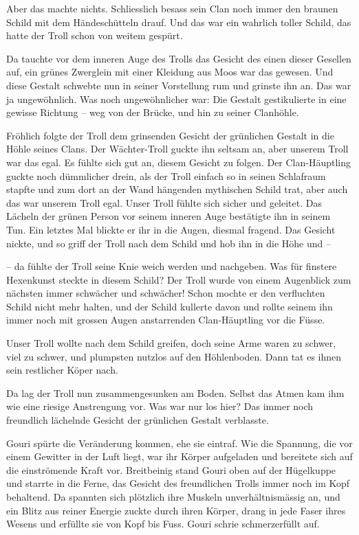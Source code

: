 \documentclass[10pt, a4paper, oneside]{book}
\begin{document}
Aber das machte nichts. Schliesslich besass sein Clan noch immer den braunen Schild mit dem Händeschütteln drauf. Und das war ein wahrlich toller Schild, das hatte der Troll schon von weitem gespürt.

Da tauchte vor dem inneren Auge des Trolls das Gesicht des einen dieser Gesellen auf, ein grünes Zwerglein mit einer Kleidung aus Moos war das gewesen. Und diese Gestalt schwebte nun in seiner Vorstellung rum und grinste ihn an. Das war ja ungewöhnlich. Was noch ungewöhnlicher war: Die Gestalt gestikulierte in eine gewisse Richtung – weg von der Brücke, und hin zu seiner Clanhöhle.
  
Fröhlich folgte der Troll dem grinsenden Gesicht der grünlichen Gestalt in die Höhle seines Clans. Der Wächter-Troll guckte ihn seltsam an, aber unserem Troll war das egal. Es fühlte sich gut an, diesem Gesicht zu folgen. Der Clan-Häuptling guckte noch dümmlicher drein, als der Troll einfach so in seinen Schlafraum stapfte und zum dort an der Wand hängenden mythischen Schild trat, aber auch das war unserem Troll egal. Unser Troll fühlte sich sicher und geleitet. Das Lächeln der grünen Person vor seinem inneren Auge bestätigte ihn in seinem Tun. Ein letztes Mal blickte er ihr in die Augen, diesmal fragend. Das Gesicht nickte, und so griff der Troll nach dem Schild und hob ihn in die Höhe und –

– da fühlte der Troll seine Knie weich werden und nachgeben. Was für finstere Hexenkunst steckte in diesem Schild? Der Troll wurde von einem Augenblick zum nächsten immer schwächer und schwächer! Schon mochte er den verfluchten Schild nicht mehr halten, und der Schild kullerte davon und rollte seinem ihn immer noch mit grossen Augen anstarrenden Clan-Häuptling vor die Füsse.

Unser Troll wollte nach dem Schild greifen, doch seine Arme waren zu schwer, viel zu schwer, und plumpsten nutzlos auf den Höhlenboden. Dann tat es ihnen sein restlicher Köper nach.

Da lag der Troll nun zusammengesunken am Boden. Selbst das Atmen kam ihm wie eine riesige Anstrengung vor. Was war nur los hier? Das immer noch freundlich lächelnde Gesicht der grünlichen Gestalt verblasste.\bigskip



Gouri spürte die Veränderung kommen, ehe sie eintraf. Wie die Spannung, die vor einem Gewitter in der Luft liegt, war ihr Körper aufgeladen und bereitete sich auf die einströmende Kraft vor. Breitbeinig stand Gouri oben auf der Hügelkuppe und starrte in die Ferne, das Gesicht des freundlichen Trolls immer noch im Kopf behaltend. Da spannten sich plötzlich ihre Muskeln unverhältnismässig an, und ein Blitz aus reiner Energie zuckte durch ihren Körper, drang in jede Faser ihres Wesens und erfüllte sie von Kopf bis Fuss. Gouri schrie schmerzerfüllt auf.
\end{document}
